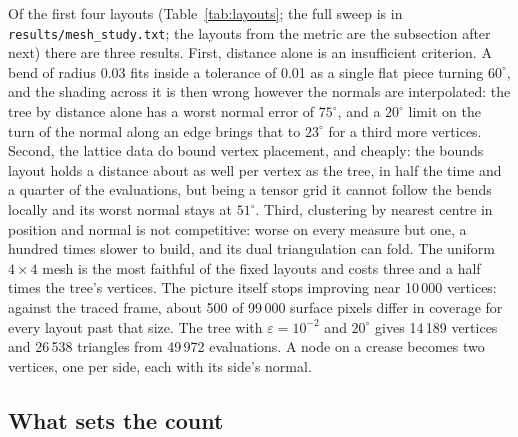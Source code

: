 \documentclass[journal]{IEEEtran}
\begin{document}
Of the first four layouts (Table~\ref{tab:layouts}; the full sweep is in
\texttt{results/mesh\_study.txt}; the layouts from the metric are the
subsection after next) there are three results. First, distance alone
is an insufficient criterion. A bend of radius 0.03 fits inside a tolerance of
0.01 as a single flat piece turning $60^\circ$, and the shading across it
is then wrong however the normals are interpolated: the tree by distance
alone has a worst normal error of $75^\circ$, and a $20^\circ$ limit on
the turn of the normal along an edge brings that to $23^\circ$ for a
third more vertices. Second, the lattice data do bound vertex placement,
and cheaply: the bounds layout holds a distance about as well per vertex
as the tree, in half the time and a quarter of the evaluations, but
being a tensor grid it cannot follow the bends locally and its worst
normal stays at $51^\circ$. Third, clustering by nearest centre in
position and normal is not competitive: worse on every measure but one,
a hundred times slower to build, and its dual triangulation can fold.
The uniform $4\times4$ mesh is the most faithful of the fixed layouts
and costs three and a half times the tree's vertices. The picture itself
stops improving near 10\,000 vertices: against the traced frame, about
500 of 99\,000 surface pixels differ in coverage for every layout past
that size. The tree with $\varepsilon=10^{-2}$
and $20^\circ$ gives 14\,189 vertices and 26\,538 triangles from 49\,972
evaluations. A node on a crease becomes two vertices, one per
side, each with its side's normal.

\subsection{What sets the count}
\end{document}
